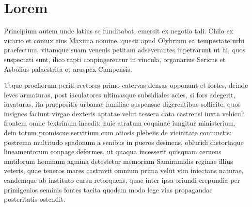 \appendix
\chapter{Lorem}
Principium autem unde latius se funditabat, emersit ex negotio tali. Chilo ex vicario et coniux eius Maxima nomine, questi apud Olybrium ea tempestate urbi praefectum, vitamque suam venenis petitam adseverantes inpetrarunt ut hi, quos suspectati sunt, ilico rapti conpingerentur in vincula, organarius Sericus et Asbolius palaestrita et aruspex Campensis.

Utque proeliorum periti rectores primo catervas densas opponunt et fortes, deinde leves armaturas, post iaculatores ultimasque subsidiales acies, si fors adegerit, iuvaturas, ita praepositis urbanae familiae suspensae digerentibus sollicite, quos insignes faciunt virgae dexteris aptatae velut tessera data castrensi iuxta vehiculi frontem omne textrinum incedit: huic atratum coquinae iungitur ministerium, dein totum promiscue servitium cum otiosis plebeiis de vicinitate coniunctis: postrema multitudo spadonum a senibus in pueros desinens, obluridi distortaque lineamentorum conpage deformes, ut quaqua incesserit quisquam cernens mutilorum hominum agmina detestetur memoriam Samiramidis reginae illius veteris, quae teneros mares castravit omnium prima velut vim iniectans naturae, eandemque ab instituto cursu retorquens, quae inter ipsa oriundi crepundia per primigenios seminis fontes tacita quodam modo lege vias propagandae posteritatis ostendit.